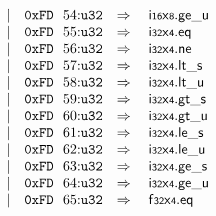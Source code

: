 $$\begin{array}[t]{@{}lrrl@{}l@{}l@{}l@{}}
& & | & \mathtt{0xFD}~~54{:}{\mathtt{u32}} & \quad\Rightarrow\quad{} & {\mathsf{i{\scriptstyle 16}}}{\mathsf{x}}{\mathsf{{\scriptstyle 8}}} {.} {\mathsf{ge}}{\mathsf{\_}}{\mathsf{u}} \\
& & | & \mathtt{0xFD}~~55{:}{\mathtt{u32}} & \quad\Rightarrow\quad{} & {\mathsf{i{\scriptstyle 32}}}{\mathsf{x}}{\mathsf{{\scriptstyle 4}}} {.} \mathsf{eq} \\
& & | & \mathtt{0xFD}~~56{:}{\mathtt{u32}} & \quad\Rightarrow\quad{} & {\mathsf{i{\scriptstyle 32}}}{\mathsf{x}}{\mathsf{{\scriptstyle 4}}} {.} \mathsf{ne} \\
& & | & \mathtt{0xFD}~~57{:}{\mathtt{u32}} & \quad\Rightarrow\quad{} & {\mathsf{i{\scriptstyle 32}}}{\mathsf{x}}{\mathsf{{\scriptstyle 4}}} {.} {\mathsf{lt}}{\mathsf{\_}}{\mathsf{s}} \\
& & | & \mathtt{0xFD}~~58{:}{\mathtt{u32}} & \quad\Rightarrow\quad{} & {\mathsf{i{\scriptstyle 32}}}{\mathsf{x}}{\mathsf{{\scriptstyle 4}}} {.} {\mathsf{lt}}{\mathsf{\_}}{\mathsf{u}} \\
& & | & \mathtt{0xFD}~~59{:}{\mathtt{u32}} & \quad\Rightarrow\quad{} & {\mathsf{i{\scriptstyle 32}}}{\mathsf{x}}{\mathsf{{\scriptstyle 4}}} {.} {\mathsf{gt}}{\mathsf{\_}}{\mathsf{s}} \\
& & | & \mathtt{0xFD}~~60{:}{\mathtt{u32}} & \quad\Rightarrow\quad{} & {\mathsf{i{\scriptstyle 32}}}{\mathsf{x}}{\mathsf{{\scriptstyle 4}}} {.} {\mathsf{gt}}{\mathsf{\_}}{\mathsf{u}} \\
& & | & \mathtt{0xFD}~~61{:}{\mathtt{u32}} & \quad\Rightarrow\quad{} & {\mathsf{i{\scriptstyle 32}}}{\mathsf{x}}{\mathsf{{\scriptstyle 4}}} {.} {\mathsf{le}}{\mathsf{\_}}{\mathsf{s}} \\
& & | & \mathtt{0xFD}~~62{:}{\mathtt{u32}} & \quad\Rightarrow\quad{} & {\mathsf{i{\scriptstyle 32}}}{\mathsf{x}}{\mathsf{{\scriptstyle 4}}} {.} {\mathsf{le}}{\mathsf{\_}}{\mathsf{u}} \\
& & | & \mathtt{0xFD}~~63{:}{\mathtt{u32}} & \quad\Rightarrow\quad{} & {\mathsf{i{\scriptstyle 32}}}{\mathsf{x}}{\mathsf{{\scriptstyle 4}}} {.} {\mathsf{ge}}{\mathsf{\_}}{\mathsf{s}} \\
& & | & \mathtt{0xFD}~~64{:}{\mathtt{u32}} & \quad\Rightarrow\quad{} & {\mathsf{i{\scriptstyle 32}}}{\mathsf{x}}{\mathsf{{\scriptstyle 4}}} {.} {\mathsf{ge}}{\mathsf{\_}}{\mathsf{u}} \\
& & | & \mathtt{0xFD}~~65{:}{\mathtt{u32}} & \quad\Rightarrow\quad{} & {\mathsf{f{\scriptstyle 32}}}{\mathsf{x}}{\mathsf{{\scriptstyle 4}}} {.} \mathsf{eq} \\

\end{array}$$
